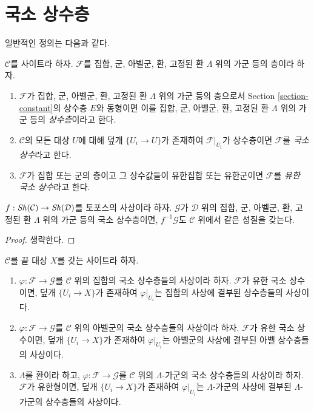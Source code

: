 \section{국소 상수층}
\label{section-locally-constant}

\noindent
일반적인 정의는 다음과 같다.

\begin{definition}
\label{definition-locally-constant}
$\mathcal{C}$를 사이트라 하자. $\mathcal{F}$를 집합, 군, 아벨군, 환,
고정된 환 $\Lambda$ 위의 가군 등의 층이라 하자.
\begin{enumerate}
\item $\mathcal{F}$가 집합, 군, 아벨군, 환, 고정된 환 $\Lambda$ 위의
가군 등의 층으로서 Section \ref{section-constant}의 상수층
$\underline{E}$와 동형이면 이를 집합, 군, 아벨군, 환,
고정된 환 $\Lambda$ 위의 가군 등의 {\it 상수층}이라고 한다.
\item $\mathcal{C}$의 모든 대상 $U$에 대해 덮개 $\{U_i \to U\}$가
존재하여 $\mathcal{F}|_{U_i}$가 상수층이면 $\mathcal{F}$를
{\it 국소 상수}라고 한다.
\item $\mathcal{F}$가 집합 또는 군의 층이고 그 상수값들이 유한집합
또는 유한군이면 $\mathcal{F}$를 {\it 유한 국소 상수}라고 한다.
\end{enumerate}
\end{definition}

\begin{lemma}
\label{lemma-pullback-locally-constant}
$f : \mathop{\mathit{Sh}}\nolimits(\mathcal{C}) \to \mathop{\mathit{Sh}}\nolimits(\mathcal{D})$를 토포스의 사상이라 하자.
$\mathcal{G}$가 $\mathcal{D}$ 위의 집합, 군, 아벨군, 환, 고정된 환
$\Lambda$ 위의 가군 등의 국소 상수층이면, $f^{-1}\mathcal{G}$도
$\mathcal{C}$ 위에서 같은 성질을 갖는다.
\end{lemma}

\begin{proof}
생략한다.
\end{proof}

\begin{lemma}
\label{lemma-morphism-locally-constant}
$\mathcal{C}$를 끝 대상 $X$를 갖는 사이트라 하자.
\begin{enumerate}
\item $\varphi : \mathcal{F} \to \mathcal{G}$를 $\mathcal{C}$ 위의
집합의 국소 상수층들의 사상이라 하자. $\mathcal{F}$가 유한 국소
상수이면, 덮개 $\{U_i \to X\}$가 존재하여 $\varphi|_{U_i}$는
집합의 사상에 결부된 상수층들의 사상이다.
\item $\varphi : \mathcal{F} \to \mathcal{G}$를 $\mathcal{C}$ 위의
아벨군의 국소 상수층들의 사상이라 하자. $\mathcal{F}$가 유한 국소
상수이면, 덮개 $\{U_i \to X\}$가 존재하여 $\varphi|_{U_i}$는
아벨군의 사상에 결부된 아벨 상수층들의 사상이다.
\item $\Lambda$를 환이라 하고, $\varphi : \mathcal{F} \to \mathcal{G}$를
$\mathcal{C}$ 위의 $\Lambda$-가군의 국소 상수층들의 사상이라 하자.
$\mathcal{F}$가 유한형이면, 덮개 $\{U_i \to X\}$가 존재하여
$\varphi|_{U_i}$는 $\Lambda$-가군의 사상에 결부된
$\Lambda$-가군의 상수층들의 사상이다.
\end{enumerate}
\end{lemma}

